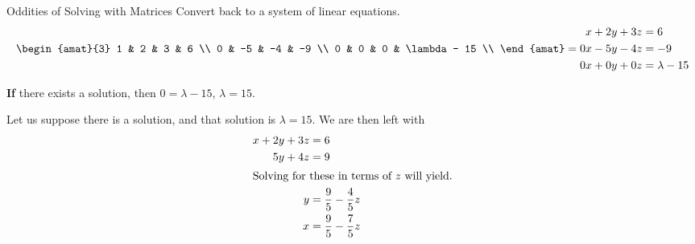 \begin{example}{Oddities of Solving with Matrices}
  Convert back to a system of linear equations.
  \begin{equation*}
    \begin{amat}{3}
      1 & 2 & 3 & 6 \\
      0 & -5 & -4 & -9 \\
      0 & 0 & 0 & \lambda - 15 \\
    \end{amat}
    =
    \begin{aligned}
      x + 2y + 3z &= 6 \\
      0x - 5y - 4z &= -9 \\
      0x + 0y + 0z &= \lambda - 15 \\
    \end{aligned}
  \end{equation*}

  \textbf{If} there exists a solution, then $0 = \lambda - 15$, $\lambda = 15$.

  Let us suppose there is a solution, and that solution is $\lambda = 15$.
  We are then left with
  \begin{align*}
    x + 2y + 3z &= 6 \\
    5y + 4z &= 9 \\
    \intertext{Solving for these in terms of $z$ will yield.}
    y &= \frac{9}{5} - \frac{4}{5}z \\
    x &= \frac{9}{5} - \frac{7}{5}z
  \end{align*}
\end{example}

